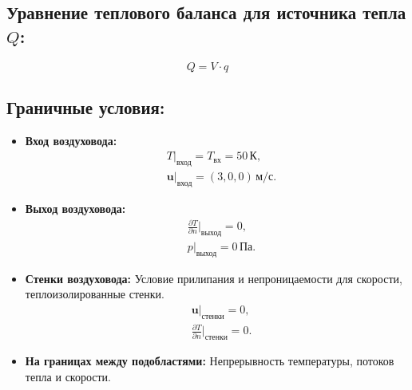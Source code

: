 \documentclass[a4paper,12pt]{article}
\theoremstyle{plain} %
\theoremstyle{definition} %
\theoremstyle{remark} %
\begin{document}
\subsection*{Уравнение теплового баланса для источника тепла $Q$:}

\begin{equation}
	Q = V \cdot q
\end{equation}

\subsection*{Граничные условия:}

\begin{itemize}
	\item \textbf{Вход воздуховода:}
	      \begin{align*}
		       & T|_\text{вход} = T_\text{вх} = 50 \, \text{К},     \\
		       & \mathbf{u}|_\text{вход} = (3, 0, 0) \, \text{м/с}.
	      \end{align*}
	\item \textbf{Выход воздуховода:}
	      \begin{align*}
		       & \frac{\partial T}{\partial n}\bigg|_\text{выход} = 0, \\
		       & p|_\text{выход} = 0 \, \text{Па}.
	      \end{align*}
	\item \textbf{Стенки воздуховода:} Условие прилипания и непроницаемости для скорости, теплоизолированные стенки.
	      \begin{align*}
		       & \mathbf{u}|_\text{стенки} = 0,                         \\
		       & \frac{\partial T}{\partial n}\bigg|_\text{стенки} = 0.
	      \end{align*}
	\item \textbf{На границах между подобластями:} Непрерывность температуры, потоков тепла и скорости.
\end{itemize}
\end{document}
